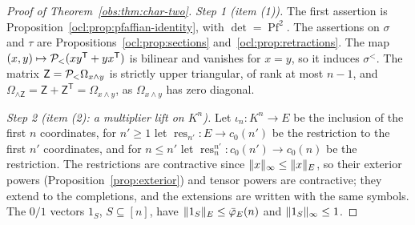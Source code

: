 \begin{proof}[Proof of Theorem~\ref{obs:thm:char-two}]
\emph{Step 1 (item (1)).} The first assertion is Proposition~\ref{ocl:prop:pfaffian-identity}, with $\det=\operatorname{Pf}^2$.
The assertions on $\sigma$ and $\tau$ are Propositions~\ref{ocl:prop:sections} and~\ref{ocl:prop:retractions}. The map $(x,y)\mapsto\mathcal P_<(xy^{\mathsf T}+
yx^{\mathsf T})$ is bilinear and vanishes for $x=y$, so it induces $\sigma^<$. The matrix $\mathsf Z=\mathcal P_<
\Omega_{x\wedge y}$ is strictly upper triangular, of rank at most $n-1$, and $\Omega_{\wedge\mathsf Z}=\mathsf Z+
\mathsf Z^{\mathsf T}=\Omega_{x\wedge y}$, as $\Omega_{x\wedge y}$ has zero diagonal.

\emph{Step 2 (item (2): a multiplier lift on $K^n$).} Let $\iota_n\colon K^n\to E$ be the inclusion of the first $n$
coordinates, for $n'\ge1$ let $\operatorname{res}_{n'}\colon E\to c_0(n')$ be the restriction to the first $n'$
coordinates, and for $n\le n'$ let $\operatorname{res}^{n'}_n\colon c_0(n')\to c_0(n)$ be the restriction. The
restrictions are contractive since $\lVert x\rVert_\infty\le\lVert x\rVert_E$, so their exterior powers (Proposition~\ref{prop:exterior})
and tensor powers are contractive; they extend to the completions, and the extensions are written with the same
symbols.
The $0/1$ vectors $1_S$, $S\subseteq[n]$, have $\lVert 1_S\rVert_E\le\bar\varphi_E(n)$ and $\lVert 1_S\rVert_\infty\le1$.


\end{proof}
